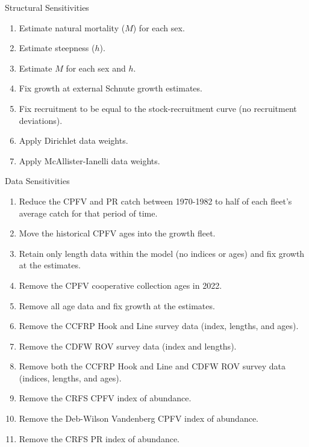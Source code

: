 \documentclass[11pt,
  english,
  letterpaper,
]{article}
\begin{document}
Structural Sensitivities

\begin{enumerate}
   
  \item  Estimate natural mortality ($M$) for each sex.
  
  \item Estimate steepness ($h$).
  
  \item Estimate $M$ for each sex and $h$.
  
  \item Fix growth at external Schnute growth estimates.
  
  \item Fix recruitment to be equal to the stock-recruitment curve (no recruitment deviations).
  
  \item Apply Dirichlet data weights.
  
  \item Apply McAllister-Ianelli data weights.

\end{enumerate}

Data Sensitivities

\begin{enumerate}
   
  \item Reduce the CPFV and PR catch between 1970-1982 to half of each fleet's average catch for that period of time.
  
  \item Move the historical CPFV ages into the growth fleet.
  
  \item Retain only length data within the model (no indices or ages) and fix growth at the estimates.
  
  \item Remove the CPFV cooperative collection ages in 2022.
  
  \item Remove all age data and fix growth at the estimates.
  
  \item Remove the CCFRP Hook and Line survey data (index, lengths, and ages).
  
  \item Remove the CDFW ROV survey data (index and lengths).
  
  \item Remove both the CCFRP Hook and Line and CDFW ROV survey data (indices, lengths, and ages).
  
  \item Remove the CRFS CPFV index of abundance.
  
  \item Remove the Deb-Wilson Vandenberg CPFV index of abundance.
  
  \item Remove the CRFS PR index of abundance.
  
\end{enumerate}
\end{document}
